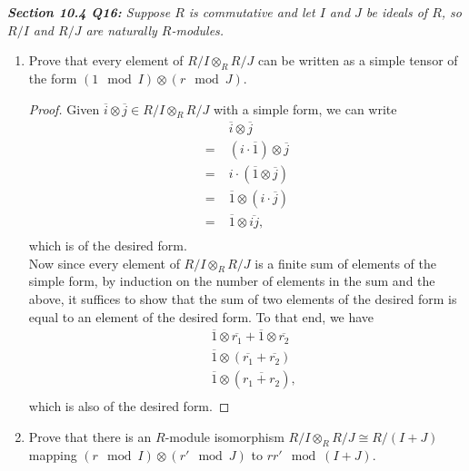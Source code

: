 \documentclass{article}
\begin{document}
\it \textbf{Section 10.4 Q16:} Suppose $R$ is commutative and let $I$ and
  $J$ be ideals of $R$, so $R/I$ and $R/J$ are naturally $R$-modules.
  \begin{enumerate}[label={(\alph*)}]
    \item Prove that every element of $R/I\otimes_R R/J$ can be written as
      a simple tensor of the form $(1\mod{I})\otimes(r\mod{J})$.
      \begin{proof}
        Given $\overline{i}\otimes\overline{j} \in R/I\otimes_R R/J$ with a
        simple form, we can write
        \begin{align*}
          &\;\overline{i}\otimes\overline{j}\\
          =&\;(i\cdot\overline{1})\otimes\overline{j}\\
          =&\;i\cdot(\overline{1}\otimes\overline{j})\\
          =&\;\overline{1}\otimes(i\cdot\overline{j})\\
          =&\;\overline{1}\otimes\overline{ij},\\
        \end{align*}
        which is of the desired form. \\

        Now since every element of $R/I\otimes_R R/J$ is a finite sum of
        elements of the simple form, by induction on the number of elements
        in the sum and the above, it suffices to show that the sum of two
        elements of the desired form is equal to an element of the desired
        form. To that end, we have
        \begin{align*}
          &\;\overline{1}\otimes\overline{r_1}
            +\overline{1}\otimes\overline{r_2}\\
          &\;\overline{1}\otimes (\overline{r_1}+\overline{r_2})\\
          &\;\overline{1}\otimes (\overline{r_1+r_2}),\\
        \end{align*}
        which is also of the desired form.
      \end{proof}

    \item Prove that there is an $R$-module isomorphism $R/I\otimes_R R/J
      \cong R/(I+J)$ mapping $(r\mod{I})\otimes(r'\mod{J})$ to
      $rr'\mod{(I+J)}$.


\end{enumerate}
\end{document}
